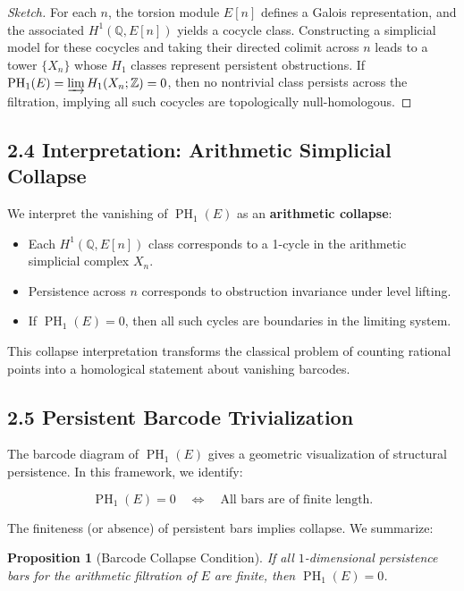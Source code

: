 \documentclass[11pt]{article}
\newtheorem{proposition}[theorem]{Proposition}
\DeclareMathOperator{\PH}{PH}
\newcommand{\QQ}{\mathbb{Q}}
\newcommand{\ZZ}{\mathbb{Z}}
\begin{document}
\begin{proof}[Sketch]
For each $n$, the torsion module $E[n]$ defines a Galois representation, and the associated $H^1(\QQ,E[n])$ yields a cocycle class.  
Constructing a simplicial model for these cocycles and taking their directed colimit across $n$ leads to a tower $\{X_n\}$ whose $H_1$ classes represent persistent obstructions.  
If $\PH_1(E) = \varinjlim H_1(X_n;\ZZ) = 0$, then no nontrivial class persists across the filtration, implying all such cocycles are topologically null-homologous.
\end{proof}

\subsection{2.4 Interpretation: Arithmetic Simplicial Collapse}

We interpret the vanishing of $\PH_1(E)$ as an \textbf{arithmetic collapse}:

\begin{itemize}
  \item Each $H^1(\QQ,E[n])$ class corresponds to a 1-cycle in the arithmetic simplicial complex $X_n$.
  \item Persistence across $n$ corresponds to obstruction invariance under level lifting.
  \item If $\PH_1(E)=0$, then all such cycles are boundaries in the limiting system.
\end{itemize}

This collapse interpretation transforms the classical problem of counting rational points into a homological statement about vanishing barcodes.

\subsection{2.5 Persistent Barcode Trivialization}

The barcode diagram of $\PH_1(E)$ gives a geometric visualization of structural persistence.  
In this framework, we identify:

\[
\PH_1(E) = 0 \quad \Longleftrightarrow \quad \text{All bars are of finite length.}
\]

The finiteness (or absence) of persistent bars implies collapse. We summarize:

\begin{proposition}[Barcode Collapse Condition]
If all $1$-dimensional persistence bars for the arithmetic filtration of $E$ are finite, then $\PH_1(E) = 0$.
\end{proposition}
\end{document}
